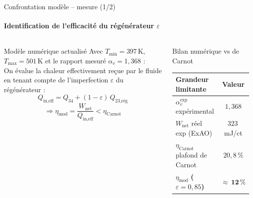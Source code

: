 \documentclass[aspectratio=43, 10pt]{beamer}
\newcommand{\rv}{\alpha_v}
\newcommand{\etaC}{\eta_{\text{Carnot}}}
\newcommand{\Wnet}{W_{\text{net}}}
\begin{document}
\begin{frame}{Confrontation mod\`ele -- mesure (1/2)}
  \framesubtitle{Identification de l'efficacit\'e du r\'eg\'en\'erateur $\varepsilon$}

  \begin{columns}[T,onlytextwidth]
      \begin{block}{Mod\`ele num\'erique actualis\'e}
        \normalsize
        Avec $T_{\min} = 397$\,K, $T_{\max} = 501$\,K et le rapport mesur\'e $\rv = 1{,}368$ :\\[4pt]
        On \'evalue la chaleur effectivement re\c{c}ue par le fluide en tenant compte de l'imperfection $\varepsilon$ du r\'eg\'en\'erateur :
        \[
          Q_{\text{in,eff}} = Q_{34} + (1-\varepsilon)\,Q_{\text{23,r\'eg}}
        \]
        \[
          \Rightarrow \eta_{\text{mod}} = \frac{\Wnet}{Q_{\text{in,eff}}} < \etaC
        \]
      \end{block}

      \begin{exampleblock}{Bilan num\'erique vs de Carnot}
        \normalsize
        \renewcommand{\arraystretch}{1.3}
        \begin{tabular}{@{}lc@{}}
          \toprule
          Grandeur limitante & Valeur \\
          \midrule
          $\rv^{\text{exp}}$ exp\'erimental & $1{,}368$ \\
          $\Wnet$ r\'eel exp (ExAO) & $323\,$mJ/ct \\
          \midrule
          $\etaC$ plafond de Carnot & $20{,}8\,\%$ \\
          $\eta_{\text{mod}}$ \textbf{($\varepsilon = 0{,}85$)} & $\mathbf{\approx\,12\,\%}$ \\
          \bottomrule
        \end{tabular}
      \end{exampleblock}
  \end{columns}
\end{frame}
\end{document}

